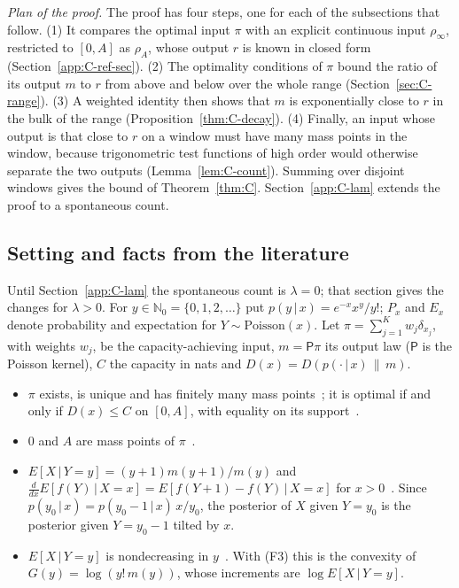 \documentclass[10pt,letterpaper]{article}
\begin{document}
\emph{Plan of the proof.} The proof has four steps, one for each of the subsections that follow. (1) It compares the optimal input $\pi$ with an explicit continuous input $\rho_\infty$, restricted to $[0,A]$ as $\rho_A$, whose output $r$ is known in closed form (Section~\ref{app:C-ref-sec}). (2) The optimality conditions of $\pi$ bound the ratio of its output $m$ to $r$ from above and below over the whole range (Section~\ref{sec:C-range}). (3) A weighted identity then shows that $m$ is exponentially close to $r$ in the bulk of the range (Proposition~\ref{thm:C-decay}). (4) Finally, an input whose output is that close to $r$ on a window must have many mass points in the window, because trigonometric test functions of high order would otherwise separate the two outputs (Lemma~\ref{lem:C-count}). Summing over disjoint windows gives the bound of Theorem~\ref{thm:C}. Section~\ref{app:C-lam} extends the proof to a spontaneous count.

\subsection{Setting and facts from the literature}

Until Section~\ref{app:C-lam} the spontaneous count is $\lambda=0$; that section gives the changes for $\lambda>0$.
For $y\in\mathbb N_0=\{0,1,2,\dots\}$ put $p(y\,|\,x)=e^{-x}x^y/y!$; $P_x$ and $E_x$ denote probability and expectation for $Y\sim\mathrm{Poisson}(x)$. Let $\pi=\sum_{j=1}^{K}w_j\delta_{x_j}$, with weights $w_j$, be the capacity-achieving input, $m=\mathsf P\pi$ its
output law ($\mathsf P$ is the Poisson kernel), $C$ the capacity in nats and $D(x)=D(p(\cdot\,|\,x)\,\|\,m)$.
\begin{itemize}
\item[(F1)] $\pi$ exists, is unique and has finitely many mass points~\cite{Shamai1990}; it is optimal if and only if $D(x)\le C$ on
$[0,A]$, with equality on its support~\cite[Lemma~1]{BDS2024}.
\item[(F2)] $0$ and $A$ are mass points of $\pi$~\cite[Corollaries~2 and~4]{Cao2014}.
\item[(F3)] $E[X\,|\,Y=y]=(y+1)m(y+1)/m(y)$ and $\frac{d}{dx}E[f(Y)\,|\,X=x]=E[f(Y+1)-f(Y)\,|\,X=x]$ for $x>0$~\cite[Appendix~D]{BDS2024}.
Since $p(y_0\,|\,x)=p(y_0-1\,|\,x)\,x/y_0$, the posterior of $X$ given $Y=y_0$ is the posterior given $Y=y_0-1$ tilted by $x$.
\item[(F4)] $E[X\,|\,Y=y]$ is nondecreasing in $y$~\cite[Lemma~3]{BDS2024}. With (F3) this is the convexity of
$G(y)=\log(y!\,m(y))$, whose increments are $\log E[X\,|\,Y=y]$.
\end{itemize}
\end{document}
